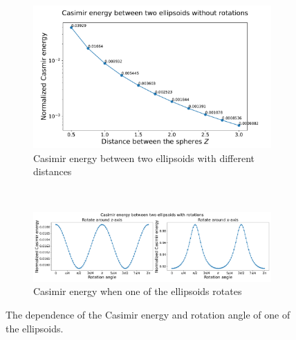     \begin{figure}[H]
        \begin{subfigure}{\linewidth}
            \centering
            \includegraphics[scale = 0.5]{figures/CasE_ellipsoids.pdf}
            \caption{Casimir energy between two ellipsoids with different distances}
            \label{Casimir energy between two ellipsoids with different distances}
            \end{subfigure}\\[1ex]
    
        \begin{subfigure}{\linewidth}
        \centering
        \hspace*{-1cm}\includegraphics[scale = 0.45]{figures/CasE_ellipsoids_with_rotation.pdf}
        \caption{Casimir energy when one of the ellipsoids rotates}
        \label{Casimir energy when one of the ellipsoids rotates}
        \end{subfigure}
        \caption{The dependence of the Casimir energy and rotation angle of one of the ellipsoids.} 
        \end{figure}

